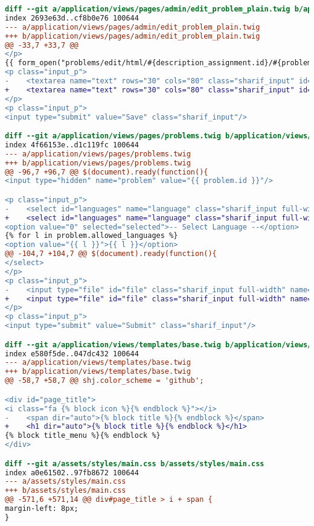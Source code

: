 \begin{itemize}
\begin{lstlisting}[language=diff, caption=Perubahan untuk mematuhi kriteria 1.3.1, label=lst_1.3.1, basicstyle=\ttfamily, frame=single,
columns=fullflexible, keepspaces=true, breaklines=true]
diff --git a/application/views/pages/admin/edit_problem_plain.twig b/application/views/pages/admin/edit_problem_plain.twig
index 2693e63d..cf8b0e76 100644
--- a/application/views/pages/admin/edit_problem_plain.twig
+++ b/application/views/pages/admin/edit_problem_plain.twig
@@ -33,7 +33,7 @@
</p>
{{ form_open("problems/edit/html/#{description_assignment.id}/#{problem.id}") }}
<p class="input_p">
-    <textarea name="text" rows="30" cols="80" class="sharif_input" id="html_editor">{{ problem.description }}</textarea>
+    <textarea name="text" rows="30" cols="80" class="sharif_input" id="html_editor" aria-label="HTML Editor">{{ problem.description }}</textarea>
</p>
<p class="input_p">
<input type="submit" value="Save" class="sharif_input"/>

diff --git a/application/views/pages/problems.twig b/application/views/pages/problems.twig
index 4f66153e..d1c119fc 100644
--- a/application/views/pages/problems.twig
+++ b/application/views/pages/problems.twig
@@ -96,7 +96,7 @@ $(document).ready(function(){
<input type="hidden" name="problem" value="{{ problem.id }}"/>

<p class="input_p">
-    <select id="languages" name="language" class="sharif_input full-width">
+    <select id="languages" name="language" class="sharif_input full-width" aria-label="Select Language">
<option value="0" selected="selected">-- Select Language --</option>
{% for l in problem.allowed_languages %}
<option value="{{ l }}">{{ l }}</option>
@@ -104,7 +104,7 @@ $(document).ready(function(){
</select>
</p>
<p class="input_p">
-    <input type="file" id="file" class="sharif_input full-width" name="userfile"/>
+    <input type="file" id="file" class="sharif_input full-width" name="userfile" aria-label="Upload File"/>
</p>
<p class="input_p">
<input type="submit" value="Submit" class="sharif_input"/>

diff --git a/application/views/templates/base.twig b/application/views/templates/base.twig
index e580f5de..047dc432 100644
--- a/application/views/templates/base.twig
+++ b/application/views/templates/base.twig
@@ -58,7 +58,7 @@ shj.color_scheme = 'github';

<div id="page_title">
<i class="fa {% block icon %}{% endblock %}"></i>
-    <span dir="auto">{% block title %}{% endblock %}</span>
+    <h1 dir="auto">{% block title %}{% endblock %}</h1>
{% block title_menu %}{% endblock %}
</div>

diff --git a/assets/styles/main.css b/assets/styles/main.css
index a0e61502..97fb8672 100644
--- a/assets/styles/main.css
+++ b/assets/styles/main.css
@@ -571,6 +571,14 @@ div#page_title > i + span {
margin-left: 8px;
}


\end{lstlisting}
\end{itemize}
